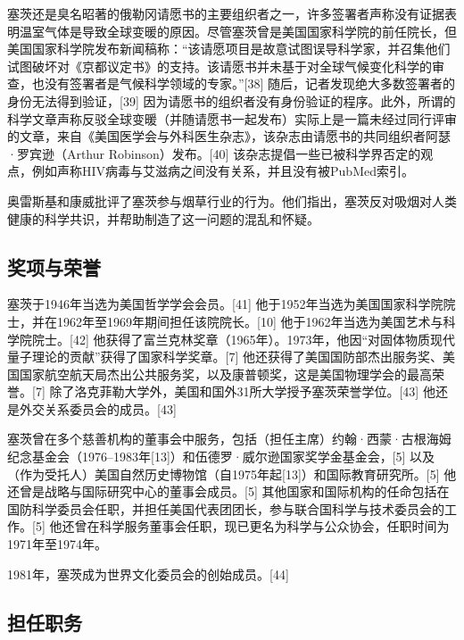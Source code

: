 塞茨还是臭名昭著的俄勒冈请愿书的主要组织者之一，许多签署者声称没有证据表明温室气体是导致全球变暖的原因。尽管塞茨曾是美国国家科学院的前任院长，但美国国家科学院发布新闻稿称：“该请愿项目是故意试图误导科学家，并召集他们试图破坏对《京都议定书》的支持。该请愿书并未基于对全球气候变化科学的审查，也没有签署者是气候科学领域的专家。”[38] 随后，记者发现绝大多数签署者的身份无法得到验证，[39] 因为请愿书的组织者没有身份验证的程序。此外，所谓的科学文章声称反驳全球变暖（并随请愿书一起发布）实际上是一篇未经过同行评审的文章，来自《美国医学会与外科医生杂志》，该杂志由请愿书的共同组织者阿瑟·罗宾逊（Arthur Robinson）发布。[40] 该杂志提倡一些已被科学界否定的观点，例如声称HIV病毒与艾滋病之间没有关系，并且没有被PubMed索引。

奥雷斯基和康威批评了塞茨参与烟草行业的行为。他们指出，塞茨反对吸烟对人类健康的科学共识，并帮助制造了这一问题的混乱和怀疑。
\subsection{奖项与荣誉}  
塞茨于1946年当选为美国哲学学会会员。[41] 他于1952年当选为美国国家科学院院士，并在1962年至1969年期间担任该院院长。[10] 他于1962年当选为美国艺术与科学院院士。[42] 他获得了富兰克林奖章（1965年）。1973年，他因“对固体物质现代量子理论的贡献”获得了国家科学奖章。[7] 他还获得了美国国防部杰出服务奖、美国国家航空航天局杰出公共服务奖，以及康普顿奖，这是美国物理学会的最高荣誉。[7] 除了洛克菲勒大学外，美国和国外31所大学授予塞茨荣誉学位。[43] 他还是外交关系委员会的成员。[43]

塞茨曾在多个慈善机构的董事会中服务，包括（担任主席）约翰·西蒙·古根海姆纪念基金会（1976–1983年[13]）和伍德罗·威尔逊国家奖学金基金会，[5] 以及（作为受托人）美国自然历史博物馆（自1975年起[13]）和国际教育研究所。[5] 他还曾是战略与国际研究中心的董事会成员。[5] 其他国家和国际机构的任命包括在国防科学委员会任职，并担任美国代表团团长，参与联合国科学与技术委员会的工作。[5] 他还曾在科学服务董事会任职，现已更名为科学与公众协会，任职时间为1971年至1974年。

1981年，塞茨成为世界文化委员会的创始成员。[44]
\subsection{担任职务}  
